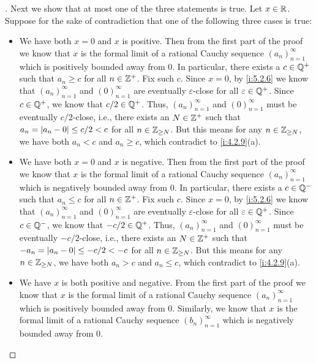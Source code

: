 \begin{proof}[]
  Next we show that at most one of the three statements is true.
  Let \(x \in \mathbb{R}\).
  Suppose for the sake of contradiction that one of the following three cases is true:
  \begin{itemize}
    \item We have both \(x = 0\) and \(x\) is positive.
          Then from the first part of the proof we know that \(x\) is the formal limit of a rational Cauchy sequence \((a_n)_{n = 1}^\infty\) which is positively bounded away from \(0\).
          In particular, there exists a \(c \in \mathbb{Q}^+\) such that \(a_n \geq c\) for all \(n \in \mathbb{Z}^+\).
          Fix such \(c\).
          Since \(x = 0\), by \cref{i:5.2.6} we know that \((a_n)_{n = 1}^\infty\) and \((0)_{n = 1}^\infty\) are eventually \(\varepsilon\)-close for all \(\varepsilon \in \mathbb{Q}^+\).
          Since \(c \in \mathbb{Q}^+\), we know that \(c / 2 \in \mathbb{Q}^+\).
          Thus, \((a_n)_{n = 1}^\infty\) and \((0)_{n = 1}^\infty\) must be eventually \(c / 2\)-close, i.e., there exists an \(N \in \mathbb{Z}^+\) such that \(a_n = \left\lvert a_n - 0\right\rvert \leq c / 2 < c\) for all \(n \in \mathbb{Z}_{\geq N}\).
          But this means for any \(n \in \mathbb{Z}_{\geq N}\), we have both \(a_n < c\) and \(a_n \geq c\), which contradict to \cref{i:4.2.9}(a).
    \item We have both \(x = 0\) and \(x\) is negative.
          Then from the first part of the proof we know that \(x\) is the formal limit of a rational Cauchy sequence \((a_n)_{n = 1}^\infty\) which is negatively bounded away from \(0\).
          In particular, there exists a \(c \in \mathbb{Q}^-\) such that \(a_n \leq c\) for all \(n \in \mathbb{Z}^+\).
          Fix such \(c\).
          Since \(x = 0\), by \cref{i:5.2.6} we know that \((a_n)_{n = 1}^\infty\) and \((0)_{n = 1}^\infty\) are eventually \(\varepsilon\)-close for all \(\varepsilon \in \mathbb{Q}^+\).
          Since \(c \in \mathbb{Q}^-\), we know that \(-c / 2 \in \mathbb{Q}^+\).
          Thus, \((a_n)_{n = 1}^\infty\) and \((0)_{n = 1}^\infty\) must be eventually \(-c / 2\)-close, i.e., there exists an \(N \in \mathbb{Z}^+\) such that \(-a_n = \left\lvert a_n - 0\right\rvert \leq -c / 2 < -c\) for all \(n \in \mathbb{Z}_{\geq N}\).
          But this means for any \(n \in \mathbb{Z}_{\geq N}\), we have both \(a_n > c\) and \(a_n \leq c\), which contradict to \cref{i:4.2.9}(a).
    \item We have \(x\) is both positive and negative.
          From the first part of the proof we know that \(x\) is the formal limit of a rational Cauchy sequence \((a_n)_{n = 1}^\infty\) which is positively bounded away from \(0\).
          Similarly, we know that \(x\) is the formal limit of a rational Cauchy sequence \((b_n)_{n = 1}^\infty\) which is negatively bounded away from \(0\).

\end{itemize}
\end{proof}
